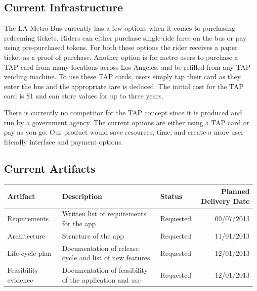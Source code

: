 \subsection{Current Infrastructure}
The LA Metro Bus currently has a few options when it comes to purchasing redeeming tickets. Riders can either purchase single-ride fares on the bus or pay using pre-purchased tokens. For both these options the rider receives a paper ticket as a proof of purchase. Another option is for metro users to purchase a TAP card from many locations across Los Angeles, and be refilled from any TAP vending machine. To use these TAP cards, users simply tap their card as they enter the bus and the appropriate fare is deduced. The initial cost for the TAP card is \$1 and can store values for up to three years. 

There is currently no competitor for the TAP concept since it is produced and run by a government agency. The current options are either using a TAP card or pay as you go. Our product would save resources, time, and create a more user friendly interface and payment options.


\subsection{Current Artifacts}
\begin{table}[h]
    \begin{tabularx}{\textwidth}{lXlr}\hline
    Artifact              & Description                                              & Status & Planned Delivery Date          \\
    \hline
    Requirements          & Written list of requirements for the app                 & Requested                   & 09/07/2013                              \\
    Architecture          & Structure of the app                                     & Requested                   & 11/01/2013                              \\
    Life-cycle plan       &  Documentation of release cycle and list of new features & Requested                   & 12/01/2013                             \\
    Feasibility evidence  & Documentation of feasibility of the application and use  & Requested                   & 12/01/2013                              \\
    \hline
    \end{tabularx}
\end{table}
\newpage
